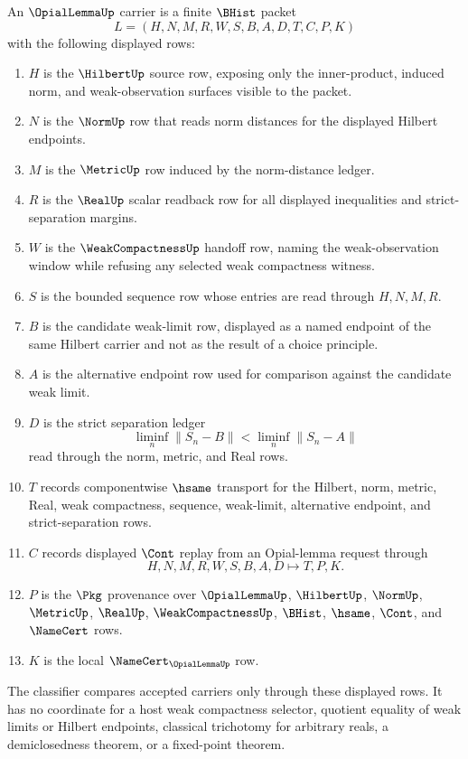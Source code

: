 \begin{definition}
\label{def:opial-lemma-carrier}
An $\OpialLemmaUp$ carrier is a finite $\BHist$ packet
$$
L=(H,N,M,R,W,S,B,A,D,T,C,P,K)
$$
with the following displayed rows:
\begin{enumerate}
\item $H$ is the $\HilbertUp$ source row, exposing only the inner-product, induced norm, and weak-observation surfaces visible to the packet.
\item $N$ is the $\NormUp$ row that reads norm distances for the displayed Hilbert endpoints.
\item $M$ is the $\MetricUp$ row induced by the norm-distance ledger.
\item $R$ is the $\RealUp$ scalar readback row for all displayed inequalities and strict-separation margins.
\item $W$ is the $\WeakCompactnessUp$ handoff row, naming the weak-observation window while refusing any selected weak compactness witness.
\item $S$ is the bounded sequence row whose entries are read through $H,N,M,R$.
\item $B$ is the candidate weak-limit row, displayed as a named endpoint of the same Hilbert carrier and not as the result of a choice principle.
\item $A$ is the alternative endpoint row used for comparison against the candidate weak limit.
\item $D$ is the strict separation ledger
$$
\liminf_n \|S_n-B\| < \liminf_n \|S_n-A\|
$$
read through the norm, metric, and Real rows.
\item $T$ records componentwise $\hsame$ transport for the Hilbert, norm, metric, Real, weak compactness, sequence, weak-limit, alternative endpoint, and strict-separation rows.
\item $C$ records displayed $\Cont$ replay from an Opial-lemma request through
$$
H,N,M,R,W,S,B,A,D \longmapsto T,P,K .
$$
\item $P$ is the $\Pkg$ provenance over $\OpialLemmaUp$, $\HilbertUp$, $\NormUp$, $\MetricUp$, $\RealUp$, $\WeakCompactnessUp$, $\BHist$, $\hsame$, $\Cont$, and $\NameCert$ rows.
\item $K$ is the local $\NameCert_{\OpialLemmaUp}$ row.
\end{enumerate}
The classifier compares accepted carriers only through these displayed rows. It has no coordinate for a host weak compactness selector, quotient equality of weak limits or Hilbert endpoints, classical trichotomy for arbitrary reals, a demiclosedness theorem, or a fixed-point theorem.
\end{definition}

